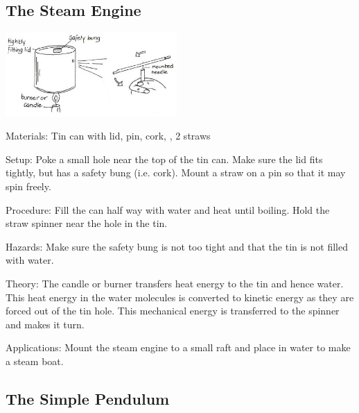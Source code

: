 \begin{multicols}{2}
\subsection{The Steam Engine}

\begin{center}
\includegraphics[width=0.49\textwidth]{./img/vso/steam-engine.jpg}
\end{center}

\begin{description*}
\item[Materials:]{Tin can with lid, pin, cork, , 2 straws}
\item[Setup:]{Poke a small hole near the top of the tin can. Make sure the lid fits tightly, but has a safety bung (i.e. cork). Mount a straw on a pin so that it may spin freely.}
\item[Procedure:]{Fill the can half way with water and heat until boiling. Hold the straw spinner near the hole in the tin.}
\item[Hazards:]{Make sure the safety bung is not too tight and that the tin is not filled with water.}
\item[Theory:]{The candle or burner transfers heat energy to the tin and hence water. This heat energy in the water molecules is converted to kinetic energy as they are forced out of the tin hole. This mechanical energy is transferred to the spinner and makes it turn.}
\item[Applications:]{Mount the steam engine to a small raft and place in water to make a steam boat.}
\end{description*}

\columnbreak

\subsection{The Simple Pendulum} 


\end{multicols}
